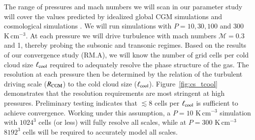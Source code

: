 \documentclass[11pt,letterpaper,english]{article}
\begin{document}
The range of pressures and mach numbers we will scan in our parameter study will cover the values predicted by idealized global CGM simulations \cite{Fielding17} and cosmological simulations \cite{Nelson+16}. We will run simulations with $P = 10, 30, 100$ and 300 K\,cm$^{-3}$.  At each pressure we will drive turbulence with mach numbers $\mathcal{M} = 0.3$ and 1, thereby probing the subsonic and transonic regimes. 
Based on the results of our convergence study (RM.A), we will know the number of grid cells per cold cloud size $\ell_{\rm cool}$ required to adequately resolve the phase structure of the gas.
The resolution at each pressure then be determined by the relation of the turbulent driving scale ($R_{\rm CGM}$) to the cold cloud size ($\ell_{\rm cool}$).
Figure~\ref{fig:cs_tcool} demonstrates that the resolution requirements are most stringent at high pressures. Preliminary testing indicates that $\lesssim 8 $ cells per $\ell_{\rm cool}$ is sufficient to achieve convergence. Working under this assumption, a $P=10$ K\,cm$^{-3}$ simulation with $1024^3$ cells (or less) will fully resolve all scales, while at $P=300$ K\,cm$^{-3}$ $8192^3$ cells will be required to accurately model all scales. 



\end{document}
